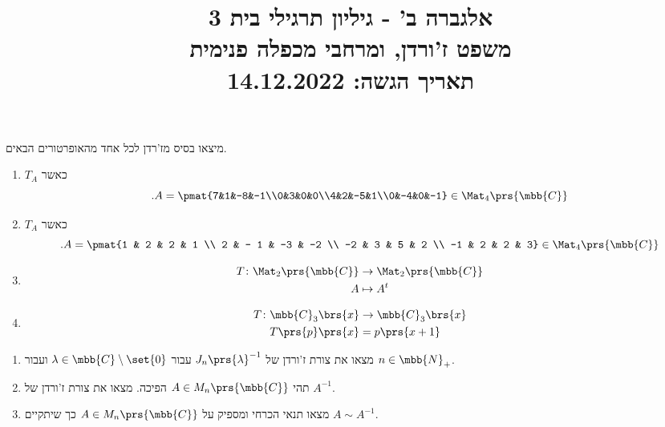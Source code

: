 \documentclass[a4paper,10pt,twoside,openany]{article}
\title{
אלגברה ב' - גיליון תרגילי בית 3 \\
משפט ז'ורדן, ומרחבי מכפלה פנימית
\\
\vspace{1cm}
\large{תאריך הגשה: 14.12.2022}
}
\date{}
\begin{document}
\maketitle

\begin{exercise}%
מיצאו בסיס מז'רדן לכל אחד מהאופרטורים הבאים.

\begin{enumerate}
\item
$T_A$
כאשר
\[\text{.} A = \pmat{7&1&-8&-1\\0&3&0&0\\4&2&-5&1\\0&-4&0&-1} \in \Mat_4\prs{\mbb{C}}\]

\item
$T_A$
כאשר
\[\text{.} A=\pmat{1 & 2 & 2 & 1 \\ 2 & - 1 & -3 & -2 \\ -2 & 3 & 5 & 2 \\ -1 & 2 & 2 & 3} \in \Mat_4\prs{\mbb{C}}\]

\item
\begin{align*}
T \colon \Mat_2\prs{\mbb{C}} &\to \Mat_2\prs{\mbb{C}} \\
A &\mapsto A^t
\end{align*}

\item
\begin{align*}
T \colon \mbb{C}_3\brs{x} &\to \mbb{C}_3\brs{x} \\
T\prs{p}\prs{x} &= p\prs{x+1}
\end{align*}
\end{enumerate}
\end{exercise}

\begin{exercise}%
\begin{enumerate}
\item מצאו את צורת ז'ורדן של
$J_n\prs{\lambda}^{-1}$
עבור
$\lambda \in \mbb{C}\setminus\set{0}$
ועבור
$n \in \mbb{N}_+$.

\item תהי
$A \in M_n\prs{\mbb{C}}$
הפיכה.
מצאו את צורת ז'ורדן של
$A^{-1}$.

\item מצאו תנאי הכרחי ומספיק על
$A \in M_n\prs{\mbb{C}}$
כך שיתקיים
$A \sim A^{-1}$.
\end{enumerate}
\end{exercise}
\end{document}

